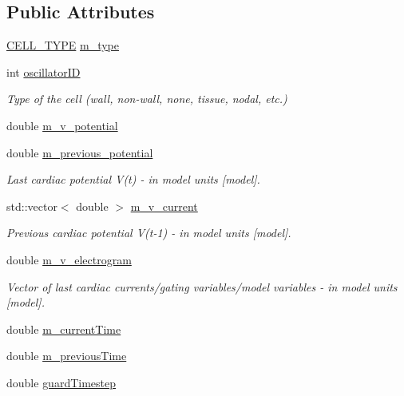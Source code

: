 \subsection*{Public Attributes}
\begin{DoxyCompactItemize}
\item 
\hyperlink{heart_defines_8h_a2f059cd81f362503874790462d535f5b}{C\+E\+L\+L\+\_\+\+T\+Y\+P\+E} \hyperlink{class_oscillator_a7553dcea69896c2f3ff2bc8bda1d05cc}{m\+\_\+type}
\item 
int \hyperlink{class_oscillator_acfc962cfc0b6c92fc8ae8d7254346bef}{oscillator\+I\+D}
\begin{DoxyCompactList}\small\item\em Type of the cell (wall, non-\/wall, none, tissue, nodal, etc.) \end{DoxyCompactList}\item 
double \hyperlink{class_oscillator_a44d11f6d153d4a061fc1bbb6785ddc18}{m\+\_\+v\+\_\+potential}
\item 
double \hyperlink{class_oscillator_a2a1649ababe43b1de3dbd6d5f24db703}{m\+\_\+previous\+\_\+potential}
\begin{DoxyCompactList}\small\item\em Last cardiac potential V(t) -\/ in model units \mbox{[}model\mbox{]}. \end{DoxyCompactList}\item 
std\+::vector$<$ double $>$ \hyperlink{class_oscillator_a344928736ed0deb40bc1c73d50af5d33}{m\+\_\+v\+\_\+current}
\begin{DoxyCompactList}\small\item\em Previous cardiac potential V(t-\/1) -\/ in model units \mbox{[}model\mbox{]}. \end{DoxyCompactList}\item 
double \hyperlink{class_oscillator_ab65a59d93c248616facbd1f01b3c2b87}{m\+\_\+v\+\_\+electrogram}
\begin{DoxyCompactList}\small\item\em Vector of last cardiac currents/gating variables/model variables -\/ in model units \mbox{[}model\mbox{]}. \end{DoxyCompactList}\item 
double \hyperlink{class_oscillator_abe68e99fc990a44b9bd234751eec0f24}{m\+\_\+current\+Time}
\item 
double \hyperlink{class_oscillator_ab97f31715485a24f49c98a01caa9f2d8}{m\+\_\+previous\+Time}
\item 
double \hyperlink{class_oscillator_a4db30c0516d078b69426aad65bf13022}{guard\+Timestep}

\end{DoxyCompactItemize}
